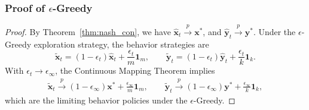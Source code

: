\documentclass[12pt]{article}
\begin{document}
\subsubsection{Proof of $\epsilon$-Greedy}
\begin{proof}
By Theorem~\ref{thm:nash_con}, we have $\widehat{\bm x}_t \stackrel{p}{\to} \bm x^\ast$, and $\widehat{\bm y}_t \stackrel{p}{\to} \bm y^\ast$. Under the $\epsilon$-Greedy exploration strategy, the behavior strategies are
\[
\widetilde{\bm x}_t =
(1-\epsilon_t)\widehat{\bm x}_t
+ \frac{\epsilon_t}{m}\mathbf 1_m,
\qquad
\widetilde{\bm y}_t = (1-\epsilon_t)\widehat{\bm y}_t
+ \frac{\epsilon_t}{k}\mathbf 1_k.
\]
With $\epsilon_t\to\epsilon_\infty$, the Continuous Mapping Theorem implies
\begin{align*}
\widetilde{\bm x}_t
\stackrel{p}{\to}
(1-\epsilon_\infty)\bm x^\ast
+ \frac{\epsilon_\infty}{m}\mathbf 1_m, 
\qquad
\widetilde{\bm y}_t
\stackrel{p}{\to}
(1-\epsilon_\infty)\bm y^\ast
+ \frac{\epsilon_\infty}{k}\mathbf 1_k,
\end{align*}
which are the limiting behavior policies under the $\epsilon$-Greedy.
\end{proof}
\end{document}
